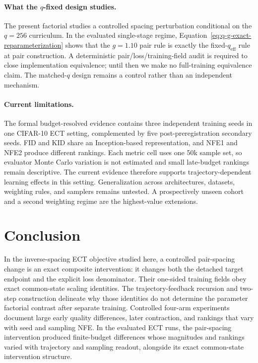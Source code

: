 \documentclass{article}
\begin{document}
\paragraph{What the $q$-fixed design studies.}
The present factorial studies a controlled spacing
perturbation conditional on the $q=256$ curriculum. In the evaluated
single-stage regime, Equation~\eqref{eq:q-g-exact-reparameterization} shows that
the $g=1.10$ pair rule is exactly the fixed-$q_{\mathrm{eff}}$ rule at pair
construction. A deterministic pair/loss/training-field audit is required to
close implementation equivalence; until then we make no full-training
equivalence claim. The matched-$q$ design remains a control rather than an
independent mechanism.

\paragraph{Current limitations.}
The formal budget-resolved evidence contains three independent training seeds
in one CIFAR-10 ECT setting, complemented by five post-preregistration
secondary seeds. FID and KID share an Inception-based representation, and NFE1
and NFE2 produce different rankings. Each metric cell uses one 50k sample set,
so evaluator Monte Carlo variation is not estimated and small late-budget
rankings remain descriptive. The current evidence therefore supports
trajectory-dependent learning effects in this setting. Generalization across
architectures, datasets, weighting rules, and samplers remains untested.
A prospectively unseen cohort and a second weighting regime are the
highest-value extensions.

\section{Conclusion}
\label{sec:conclusion}

In the inverse-spacing ECT objective studied here, a controlled pair-spacing
change is an exact composite intervention: it changes both the detached target
endpoint and the explicit loss denominator.
Their one-sided training fields obey exact common-state scaling identities.
The trajectory-feedback recursion and two-step construction delineate why those
identities do not determine the parameter factorial contrast after separate
training. Controlled four-arm experiments document large early
quality differences, later contraction, and rankings that vary with seed and
sampling NFE. In the evaluated ECT runs, the pair-spacing intervention produced
finite-budget differences whose magnitudes and rankings varied with trajectory
and sampling readout, alongside its exact common-state intervention structure.
\end{document}
